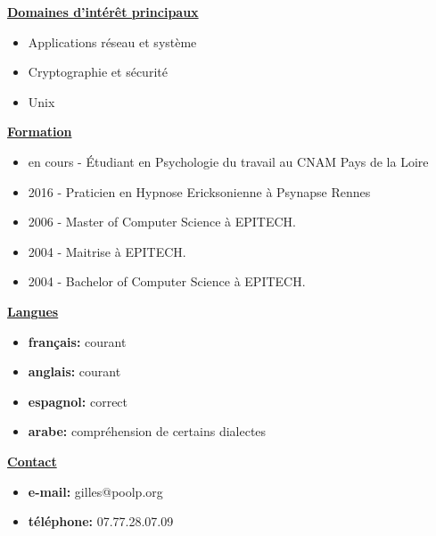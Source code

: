 \documentclass[a4paper,10pt]{letter}
\begin{document}
\underline{\textbf{Domaines d'int\'er\^et principaux}}\\
\begin{itemize}
\item Applications r\'eseau et syst\`eme
\item Cryptographie et s\'ecurit\'e
\item Unix\\
\end{itemize}

\underline{\textbf{Formation}}\\
\begin{itemize}
\item en cours - \'Etudiant en Psychologie du travail au CNAM Pays de la Loire
\item 2016 - Praticien en Hypnose Ericksonienne \`a Psynapse Rennes
\item 2006 - Master of Computer Science \`a {EPITECH.}
\item 2004 - Maitrise \`a {EPITECH.}
\item 2004 - Bachelor of Computer Science \`a {EPITECH.}\\
\end{itemize}

\underline{\textbf{Langues}}\\
\begin{itemize}
\item	\textbf{fran\c cais:}	courant
\item	\textbf{anglais:}		courant
\item	\textbf{espagnol:}		correct
\item	\textbf{arabe:}			compr\'ehension de certains dialectes\\
\end{itemize}

\underline{\textbf{Contact}}\\
\begin{itemize}
\item	\textbf{e-mail:}	gilles@poolp.org
\item	\textbf{t\'el\'ephone:}	07.77.28.07.09
\end{itemize}

\pagebreak
\end{document}
